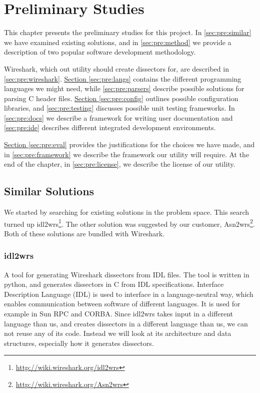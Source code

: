 \chapter{Preliminary Studies}
This chapter presents the preliminary studies for this project.
In \autoref{sec:pre:similar} we have examined existing solutions, and in
\autoref{sec:pre:method} we provide a description of two popular software
development methodology.

Wireshark, which out utility should create dissectors for, are described in
\autoref{sec:pre:wireshark}.
\hyperref[sec:pre:langs]{Section \ref*{sec:pre:langs}} contains the different
programming languages we might need, while \autoref{sec:pre:parsers}
describe possible solutions for parsing C header files.
\hyperref[sec:pre:config]{Section \ref*{sec:pre:config}} outlines possible
configuration libraries, and \autoref{sec:pre:testing} discusses possible unit
testing frameworks. In \autoref{sec:pre:docs} we describe a framework for
writing user documentation and \autoref{sec:pre:ide} describes different
integrated development environments.

\hyperref[sec:pre:eval]{Section \ref*{sec:pre:eval}} provides the
justifications for the choices we have made, and in
\autoref{sec:pre:framework} we describe the framework our utility will require.
At the end of the chapter, in \autoref{sec:pre:license}, we describe the
license of our utility.


\section{Similar Solutions}
\label{sec:pre:similar}

We started by searching for existing solutions in the problem space. This
search turned up idl2wrs\footnote{\url{http://wiki.wireshark.org/idl2wrs}}.
The other solution was suggested by our customer,
Asn2wrs\footnote{\url{http://wiki.wireshark.org/Asn2wrs}}.
Both of these solutions are bundled with Wireshark.

\subsection{idl2wrs}
A tool for generating Wireshark dissectors from IDL files. The tool is written
in python, and generates dissectors in C from IDL specifications. Interface
Description Language (IDL) is used to interface in a language-neutral way,
which enables communication between software of different languages. It is
used for example in Sun RPC and CORBA. Since idl2wrs takes input in a different
language than us, and creates dissectors in a different language than us, we
can not reuse any of its code. Instead we will look at its architecture and
data structures, especially how it generates dissectors.

